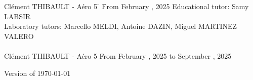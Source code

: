 \begin{titlepage}
    \begin{tabbing}
        Clément THIBAULT - Aéro 5 \= \hspace{6cm} \= From February , 2025 \kill
        Educational tutor: Samy LABSIR \\
        Laboratory tutors: Marcello MELDI, Antoine DAZIN, Miguel MARTINEZ VALERO \\
        \\        
        Clément THIBAULT - Aéro 5 \hspace{3cm} From February , 2025 to September , 2025 
    \end{tabbing}

    \begin{center}
        Version of \today 
    \end{center}
    

    
\end{titlepage}
